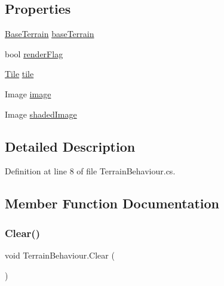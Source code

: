 \subsection*{Properties}
\begin{DoxyCompactItemize}
\item 
\mbox{\hyperlink{class_base_terrain}{Base\+Terrain}} \mbox{\hyperlink{class_terrain_behaviour_aeaebeaa90adc3c4b41853845a54a474e}{base\+Terrain}}
\item 
bool \mbox{\hyperlink{class_terrain_behaviour_ada11b3216887b92ca5f1de3e7165b4c2}{render\+Flag}}
\item 
\mbox{\hyperlink{class_tile}{Tile}} \mbox{\hyperlink{class_terrain_behaviour_a1c30fc3fee30bea9e90ee4acabcb5819}{tile}}
\item 
Image \mbox{\hyperlink{class_terrain_behaviour_a06f02f134baac6f02594037be9bf41d9}{image}}
\item 
Image \mbox{\hyperlink{class_terrain_behaviour_a91996bf69ee24b36099fa7a6b54aeaa5}{shaded\+Image}}
\end{DoxyCompactItemize}


\subsection{Detailed Description}


Definition at line 8 of file Terrain\+Behaviour.\+cs.



\subsection{Member Function Documentation}
\mbox{\label{class_terrain_behaviour_a23ffdd00ac2a41293dff38496a09663d}} 
\subsubsection{\texorpdfstring{Clear()}{Clear()}}
{\footnotesize\ttfamily void Terrain\+Behaviour.\+Clear (\begin{DoxyParamCaption}{ }\end{DoxyParamCaption})}



